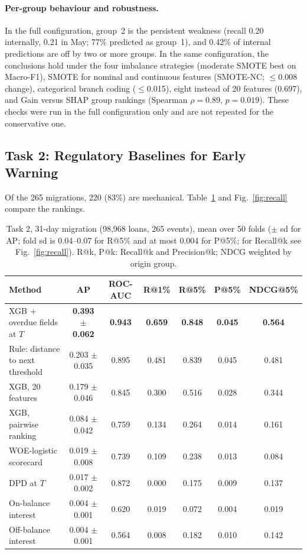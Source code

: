 \documentclass[runningheads]{llncs}
\begin{document}
\paragraph{Per-group behaviour and robustness.} In the full configuration, group~2 is the persistent weakness (recall 0.20 internally, 0.21 in May; 77\% predicted as group~1), and 0.42\% of internal predictions are off by two or more groups. In the same configuration, the conclusions hold under the four imbalance strategies (moderate SMOTE best on Macro-F1), SMOTE for nominal and continuous features (SMOTE-NC; $\le$0.008 change), categorical branch coding ($\le$0.015), eight instead of 20 features (0.697), and Gain versus SHAP group rankings (Spearman $\rho=0.89$, $p=0.019$). These checks were run in the full configuration only and are not repeated for the conservative one.

\subsection{Task 2: Regulatory Baselines for Early Warning}

Of the 265 migrations, 220 (83\%) are mechanical. Table~\ref{tab:task2} and Fig.~\ref{fig:recall} compare the rankings.

\begin{table}[t]
\centering
\caption{Task 2, 31-day migration (98,968 loans, 265 events), mean over 50 folds ($\pm$ sd for AP; fold sd is 0.04--0.07 for R@5\% and at most 0.004 for P@5\%; for Recall@k see Fig.~\ref{fig:recall}). R@k, P@k: Recall@k and Precision@k; NDCG weighted by origin group.}
\label{tab:task2}
\scriptsize
\setlength{\tabcolsep}{2.6pt}
\begin{tabular}{@{}lcccccc@{}}
\toprule
Method & AP & ROC-AUC & R@1\% & R@5\% & P@5\% & NDCG@5\% \\
\midrule
XGB + overdue fields at $T$ & \textbf{0.393 $\pm$ 0.062} & \textbf{0.943} & \textbf{0.659} & \textbf{0.848} & \textbf{0.045} & \textbf{0.564}\\
Rule: distance to next threshold & 0.203 $\pm$ 0.035 & 0.895 & 0.481 & 0.839 & 0.045 & 0.481\\
XGB, 20 features & 0.179 $\pm$ 0.046 & 0.845 & 0.300 & 0.516 & 0.028 & 0.344\\
XGB, pairwise ranking & 0.084 $\pm$ 0.042 & 0.759 & 0.134 & 0.264 & 0.014 & 0.161\\
WOE-logistic scorecard & 0.019 $\pm$ 0.008 & 0.739 & 0.109 & 0.238 & 0.013 & 0.084\\
DPD at $T$ & 0.017 $\pm$ 0.002 & 0.872 & 0.000 & 0.175 & 0.009 & 0.137\\
On-balance interest & 0.004 $\pm$ 0.001 & 0.620 & 0.019 & 0.072 & 0.004 & 0.019\\
Off-balance interest & 0.004 $\pm$ 0.001 & 0.564 & 0.008 & 0.182 & 0.010 & 0.142\\
\bottomrule
\end{tabular}
\end{table}
\end{document}
